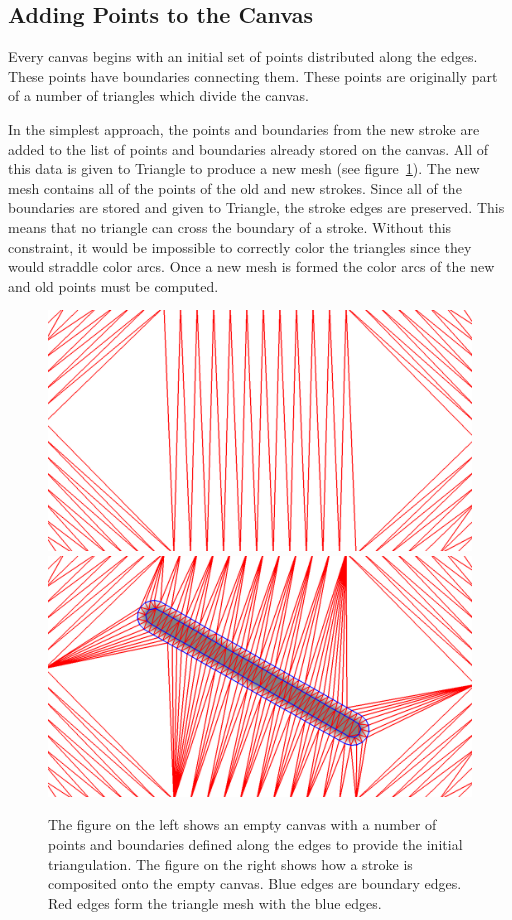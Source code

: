 \documentclass[review]{acmsiggraph}
\begin{document}
\subsection{Adding Points to the Canvas}

Every canvas begins with an initial set of points distributed along the edges. These
points have boundaries connecting them. These points are originally part of a number of triangles which
divide the canvas.

In the simplest approach, the points and boundaries from the new stroke are added
to the list of points and boundaries already stored on the canvas. All of this data is given to Triangle
to produce a new mesh (see figure~\ref{fig:firststrokes}). The new mesh contains all of the points of the old and new strokes. Since
all of the boundaries are stored and given to Triangle, the stroke edges are preserved. This means that
no triangle can cross the boundary of a stroke. Without this constraint, it would be impossible to correctly color the
triangles since they would straddle color arcs. Once a new mesh is formed the color arcs of the 
new and old points must be computed.


\begin{figure}
    \centering
        \includegraphics[width=.23\textwidth]{images/emptycanvas}
        \includegraphics[width=.23\textwidth]{images/canvaswithonestroke}
    \caption{The figure on the left shows an empty canvas with a number of points and boundaries defined along the edges
             to provide the initial triangulation. The figure on the right shows how a stroke is composited onto
             the empty canvas. Blue edges are boundary edges. Red edges form the triangle mesh with the blue edges.}
    \label{fig:firststrokes}
\end{figure}
\end{document}
